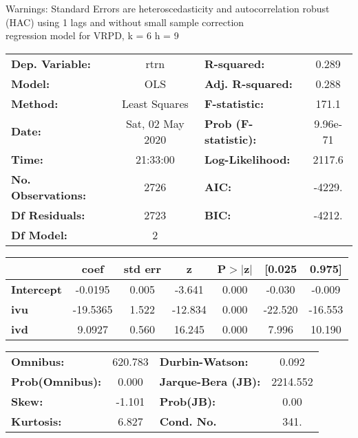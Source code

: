 Warnings: \newline
 [1] Standard Errors are heteroscedasticity and autocorrelation robust (HAC) using 1 lags and without small sample correction\\ 

regression model for VRPD, k = 6 h = 9\begin{center}
\begin{tabular}{lclc}
\toprule
\textbf{Dep. Variable:}    &       rtrn       & \textbf{  R-squared:         } &     0.289   \\
\textbf{Model:}            &       OLS        & \textbf{  Adj. R-squared:    } &     0.288   \\
\textbf{Method:}           &  Least Squares   & \textbf{  F-statistic:       } &     171.1   \\
\textbf{Date:}             & Sat, 02 May 2020 & \textbf{  Prob (F-statistic):} &  9.96e-71   \\
\textbf{Time:}             &     21:33:00     & \textbf{  Log-Likelihood:    } &    2117.6   \\
\textbf{No. Observations:} &        2726      & \textbf{  AIC:               } &    -4229.   \\
\textbf{Df Residuals:}     &        2723      & \textbf{  BIC:               } &    -4212.   \\
\textbf{Df Model:}         &           2      & \textbf{                     } &             \\
\bottomrule
\end{tabular}
\begin{tabular}{lcccccc}
                   & \textbf{coef} & \textbf{std err} & \textbf{z} & \textbf{P$> |$z$|$} & \textbf{[0.025} & \textbf{0.975]}  \\
\midrule
\textbf{Intercept} &      -0.0195  &        0.005     &    -3.641  &         0.000        &       -0.030    &       -0.009     \\
\textbf{ivu}       &     -19.5365  &        1.522     &   -12.834  &         0.000        &      -22.520    &      -16.553     \\
\textbf{ivd}       &       9.0927  &        0.560     &    16.245  &         0.000        &        7.996    &       10.190     \\
\bottomrule
\end{tabular}
\begin{tabular}{lclc}
\textbf{Omnibus:}       & 620.783 & \textbf{  Durbin-Watson:     } &    0.092  \\
\textbf{Prob(Omnibus):} &   0.000 & \textbf{  Jarque-Bera (JB):  } & 2214.552  \\
\textbf{Skew:}          &  -1.101 & \textbf{  Prob(JB):          } &     0.00  \\
\textbf{Kurtosis:}      &   6.827 & \textbf{  Cond. No.          } &     341.  \\
\bottomrule
\end{tabular}
\end{center}

